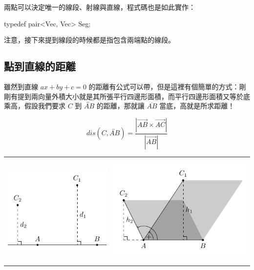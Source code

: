 \documentclass[main.tex]{subfiles}
\begin{document}
兩點可以決定唯一的線段、射線與直線，程式碼也是如此實作：

\begin{C++}
typedef pair<Vec, Vec> Seg;
\end{C++}

注意，接下來提到線段的時候都是指包含兩端點的線段。

\subsection{點到直線的距離}

雖然到直線 $ax + by + c = 0$ 的距離有公式可以帶，但是這裡有個簡單的方式：剛剛有提到兩向量外積大小就是其所張平行四邊形面積，而平行四邊形面積又等於底乘高，假設我們要求 $C$ 到 $\overleftrightarrow{AB}$ 的距離，那就讓 $\overline{AB}$ 當底，高就是所求距離！

$$dis(C, \overleftrightarrow{AB}) = \frac{|\vec{AB} \times \vec{AC}|}{|\vec{AB}|}$$

\begin{table}[h!]
	\begin{tabular}{p{7cm} p{7cm}}
		\begin{center}
			\includegraphics*{images/Geometry/Basic/PointToLine1.pdf}
		\end{center} &
		\begin{center}
			\includegraphics*{images/Geometry/Basic/PointToLine2.pdf}
		\end{center}
	\end{tabular}
\end{table}
\end{document}
